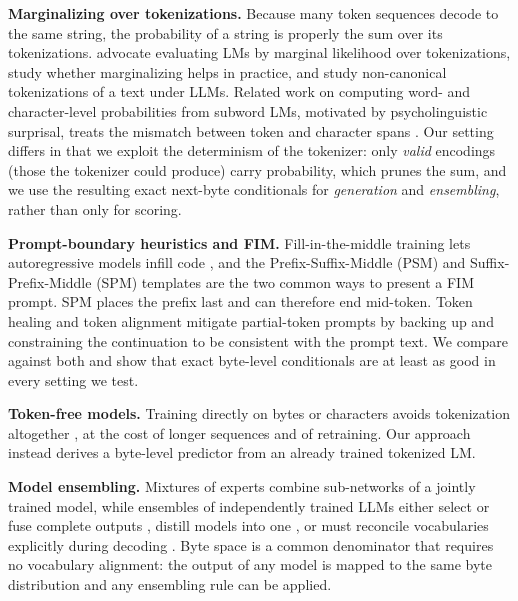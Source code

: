 \documentclass{article} %
\begin{document}
\textbf{Marginalizing over tokenizations.} Because many token sequences decode to the same string, the probability of a string is properly the sum over its tokenizations. \citet{cao2021you} advocate evaluating LMs by marginal likelihood over tokenizations, \citet{chirkova2023should} study whether marginalizing helps in practice, and \citet{geh2024signal} study non-canonical tokenizations of a text under LLMs. Related work on computing word- and character-level probabilities from subword LMs, motivated by psycholinguistic surprisal, treats the mismatch between token and character spans \citep{pimentel2024compute,giulianelli2024proper}. Our setting differs in that we exploit the determinism of the tokenizer: only \emph{valid} encodings (those the tokenizer could produce) carry probability, which prunes the sum, and we use the resulting exact next-byte conditionals for \emph{generation} and \emph{ensembling}, rather than only for scoring.

\textbf{Prompt-boundary heuristics and FIM.} Fill-in-the-middle training lets autoregressive models infill code \citep{bavarian2022efficient,fried2023incoder,roziere2023code}, and the Prefix-Suffix-Middle (PSM) and Suffix-Prefix-Middle (SPM) templates are the two common ways to present a FIM prompt. SPM places the prefix last and can therefore end mid-token. Token healing \citep{dagan2024getting} and token alignment \citep{athiwaratkun2024token} mitigate partial-token prompts by backing up and constraining the continuation to be consistent with the prompt text. We compare against both and show that exact byte-level conditionals are at least as good in every setting we test.

\textbf{Token-free models.} Training directly on bytes or characters avoids tokenization altogether \citep{clark2022canine,xue2022byt5,yu2023megabyte,wang2024mambabyte}, at the cost of longer sequences and of retraining. Our approach instead derives a byte-level predictor from an already trained tokenized LM.

\textbf{Model ensembling.} Mixtures of experts \citep{shazeer2017outrageously,jiang2024mixtral} combine sub-networks of a jointly trained model, while ensembles of independently trained LLMs either select or fuse complete outputs \citep{jiang2023llm}, distill models into one \citep{wan2024knowledge}, or must reconcile vocabularies explicitly during decoding \citep{xu2024bridging,huang2024ensemble}. Byte space is a common denominator that requires no vocabulary alignment: the output of any model is mapped to the same byte distribution and any ensembling rule can be applied.
\end{document}
